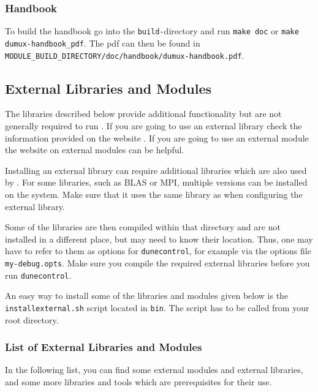 \subsubsection{Handbook}
To build the \Dumux handbook go into the \texttt{build-}directory and
run \texttt{make doc} or \texttt{make dumux-handbook\_pdf}. The pdf can then be found
in \texttt{MODULE\_BUILD\_DIRECTORY/doc/handbook/dumux-handbook.pdf}.


\subsection{External Libraries and Modules} \label{sec:external-modules-libraries}
The libraries described below provide additional functionality but are not generally required to run \Dumux.
If you are going to use an external library check the information provided on the \Dune website \cite{DUNE-EXT-LIB}.
If you are going to use an external \Dune module the website on external modules \cite{DUNE-EXT-MOD} can be helpful.

Installing an external library can require additional libraries which are also used by \Dune.
For some libraries, such as BLAS or MPI, multiple versions can be installed on the system.
Make sure that it uses the same library as \Dune when configuring the external library.

Some of the libraries are then compiled within that directory and are not installed in
a different place, but \Dune may need to know their location. Thus, one may have to refer to
them as options for \texttt{dunecontrol}, for example via the options file \texttt{my-debug.opts}.
Make sure you compile the required external libraries before you run \texttt{dunecontrol}.

An easy way to install some of the libraries and modules given below is the
\texttt{installexternal.sh} script located in \texttt{bin}. The script
has to be called from your {\Dune} root directory.


\subsubsection{List of External Libraries and Modules}
In the following list, you can find some external modules and external libraries,
and some more libraries and tools which are prerequisites for their use.


